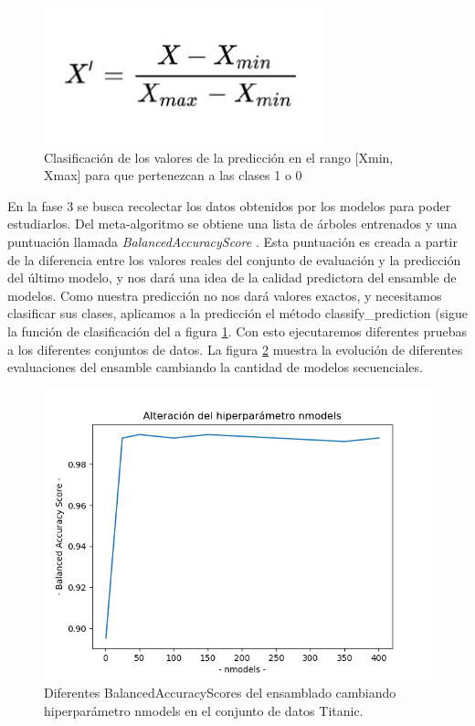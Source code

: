 \documentclass[conference,a4paper]{IEEEtran}
\begin{document}
\begin{figure}[ht]
  \begin{center}
    \includegraphics[scale=0.70]{figures/funcion_clasificacion_valores_prediccion.png}
    \caption{Clasificación de los valores de la predicción en el rango [Xmin, Xmax] para que pertenezcan a las clases 1 o 0}
    \label{fig:funcion_clasificacion}
  \end{center}
\end{figure}

En la fase 3 se busca recolectar los datos obtenidos por los modelos para poder estudiarlos. Del meta-algoritmo se obtiene una lista de árboles entrenados y una puntuación llamada \textit{BalancedAccuracyScore} \cite{b17}. Esta puntuación es creada a partir de la diferencia entre los valores reales del conjunto de evaluación y la predicción del último modelo, y nos dará una idea de la calidad predictora del ensamble de modelos. Como nuestra predicción no nos dará valores exactos, y necesitamos clasificar sus clases, aplicamos a la predicción el método classify\_prediction (sigue la función de clasificación del a figura \ref{fig:funcion_clasificacion}. Con esto ejecutaremos diferentes pruebas a los diferentes conjuntos de datos. La figura \ref{fig:nmodels_titanic} muestra la evolución de diferentes evaluaciones del ensamble cambiando la cantidad de modelos secuenciales.\\


\begin{figure}[ht]
  \begin{center}
    \includegraphics[scale=0.30]{figures/nmodels_titanic_tree.png}
    \caption{Diferentes BalancedAccuracyScores del ensamblado cambiando hiperparámetro nmodels en el conjunto de datos Titanic.}
    \label{fig:nmodels_titanic}
  \end{center}
\end{figure}
\end{document}
